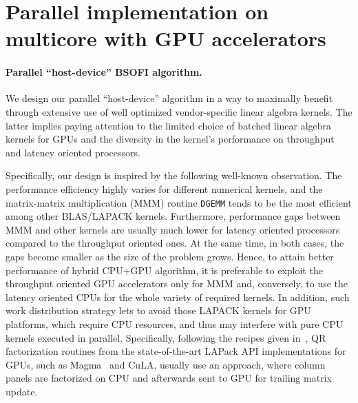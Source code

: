 \documentclass{llncs}
\newcommand{\Lapack}{{\sc LAPack}\xspace}
\newcommand{\Magma}{{\sc Magma}\xspace}
\newcommand{\Cula}{{\sc CuLA}\xspace}
\begin{document}
\section{Parallel implementation on multicore with GPU accelerators}
\label{sec:implementation_on_CPU+GPU}

\paragraph%
{Parallel ``host-device'' BSOFI algorithm.}\label{sec:alrorithms_for_accelerators}

We design our parallel ``host-device'' algorithm in a way to maximally benefit 
through extensive use of well optimized vendor-specific 
linear algebra kernels. %
The latter implies paying attention to 
the limited choice of batched linear algebra kernels for GPUs
and the diversity in the kernel's performance on throughput and latency oriented processors.

Specifically, our design is inspired by the following well-known 
observation. %
The performance efficiency
highly varies for different numerical kernels, 
and the matrix-matrix multiplication (MMM) routine {\tt DGEMM}
tends to be the most efficient among other BLAS/LAPACK kernels. %
Furthermore, performance gaps between MMM and other kernels
are usually much lower for 
latency oriented processors compared to the throughput oriented ones.
At the same time, in both cases, the gaps become smaller as the size of the problem grows.
Hence, 
to attain better performance of hybrid CPU+GPU algorithm, 
it is preferable to exploit 
the throughput oriented GPU accelerators only for MMM
and, conversely, 
to use the latency oriented CPUs for the whole variety of required kernels.
In addition, such work distribution strategy
lets to avoid those LAPACK kernels for GPU platforms,
which require CPU resources, 
and thus may 
interfere with pure CPU kernels
executed in parallel.
Specifically, %
following the recipes given in~\cite{Volkov08LU_QR_Cholesky},
QR factorization routines 
from the state-of-the-art \Lapack API implementations for GPUs,
such as \Magma~\cite{Tomov10Magma} and
\Cula,
usually use an approach, 
where column panels are factorized on CPU 
and afterwards sent to GPU for trailing matrix update.%
\end{document}
